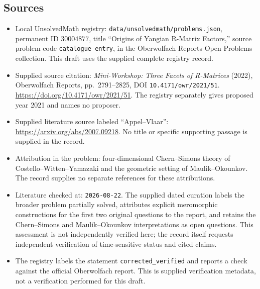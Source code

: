 \documentclass[11pt]{article}
\begin{document}
\subsection{Sources}
\begin{itemize}
\item Local UnsolvedMath registry: \texttt{data/unsolvedmath/problems.json}, permanent ID \(30004877\), title ``Origins of Yangian R-Matrix Factors,'' source problem code \texttt{catalogue entry}, in the Oberwolfach Reports Open Problems collection. This draft uses the supplied complete registry record.
\item Supplied source citation: \emph{Mini-Workshop: Three Facets of R-Matrices} (2022), Oberwolfach Reports, pp.\ 2791--2825, DOI \texttt{10.4171/owr/2021/51}. \url{https://doi.org/10.4171/owr/2021/51}. The registry separately gives proposed year 2021 and names no proposer.
\item Supplied literature source labeled ``Appel--Vlaar'': \url{https://arxiv.org/abs/2007.09218}. No title or specific supporting passage is supplied in the record.
\item Attribution in the problem: four-dimensional Chern--Simons theory of Costello--Witten--Yamazaki and the geometric setting of Maulik--Okounkov. The record supplies no separate references for these attributions.
\item Literature checked at: \texttt{2026-08-22}. The supplied dated curation labels the broader problem partially solved, attributes explicit meromorphic constructions for the first two original questions to the report, and retains the Chern--Simons and Maulik--Okounkov interpretations as open questions. This assessment is not independently verified here; the record itself requests independent verification of time-sensitive status and cited claims.
\item The registry labels the statement \texttt{corrected\_verified} and reports a check against the official Oberwolfach report. This is supplied verification metadata, not a verification performed for this draft.
\end{itemize}
\end{document}
